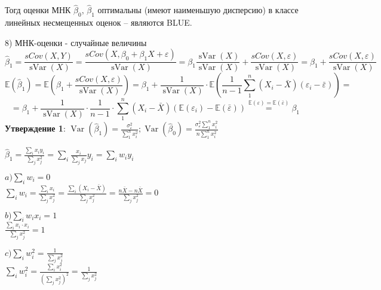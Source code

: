 \documentclass[12pt]{article}
\newcommand{\e}{\mathbb{E}}
\DeclareMathOperator{\var}{Var}
\DeclareMathOperator{\svar}{sVar}
\renewcommand{\epsilon}{\varepsilon}
\newcommand{\msum}{\sum\limits_1^n}
\newcommand{\isum}{\sum\limits_i}
\newcommand{\jsum}{\sum\limits_j}
\begin{document}
Тогд оценки МНК $\hat{\beta}_0, \, \hat{\beta}_1$ оптимальны (имеют наименьшую дисперсию) в классе линейных несмещенных оценок -- являются BLUE.

8) МНК-оценки - случайные величины
$$\hat{\beta}_1 = \frac{sCov(X,Y)}{\svar(X)} = \frac{sCov(X,\beta_0 + \beta_1 X + \epsilon)}{\svar(X)} = \beta_1 \frac{\svar(X)}{\svar(X)} + \frac{sCov(X,\epsilon)}{\svar(X)} = \beta_1 + \frac{sCov(X,\epsilon)}{\svar(X)}$$
$$\e(\hat{\beta}_1) = \e\left(\beta_1 + \frac{sCov(X,\epsilon)}{\svar(X)}\right) = \beta_1 + \frac{1}{\svar(X)} \cdot \e\left(\frac{1}{n-1} \msum(X_i - \bar{X})(\epsilon_i - \bar{\epsilon})\right) =$$
$$= \beta_1 + \frac{1}{\svar(X)} \cdot \frac{1}{n-1} \cdot \msum (X_i - \bar{X})(\e(\epsilon_i) - \e(\bar{\epsilon})) \stackrel{\e(\epsilon) = \e(\bar{\epsilon})}{=} \beta_1$$
\textbf{Утверждение 1}: $\displaystyle\var(\hat{\beta}_1) = \frac{\sigma_{\epsilon}^2}{\msum x_i^2}; \var(\hat{\beta}_0) = \frac{\sigma_{\epsilon}^2 \msum x_i^2}{n \msum x_i^2}$

$\displaystyle\hat{\beta}_1 = \frac{\isum x_i y_i}{\jsum x_j^2} = \isum \frac{x_i}{\jsum x_j} y_i = \isum w_i y_i$

\begin{minipage}{0.51\textwidth}
$a) \displaystyle\isum w_i = 0$\\

$\displaystyle\isum w_i = \frac{\isum x_i}{\jsum x_j^2} = \frac{\isum(X_i - \bar{X})}{\jsum x_j^2} = \frac{n\bar{X} - n\bar{X}}{\jsum x_j^2} = 0$
\end{minipage}
\begin{minipage}{0.18\textwidth}
$b) \displaystyle\isum w_i x_i = 1$\\[2mm]
$\displaystyle\frac{\isum x_i \cdot x_i}{\jsum x_j^2} = 1$
\end{minipage}
\begin{minipage}{0.3\textwidth}
$c) \displaystyle\isum w_i^2 = \frac{1}{\jsum x_j^2}$\\[2mm]

$\displaystyle\isum w_i^2 = \frac{\isum x_i^2}{(\jsum x_j^2)^2} = \frac{1}{\jsum x_j^2}$\\[3mm]
\end{minipage}
\end{document}
